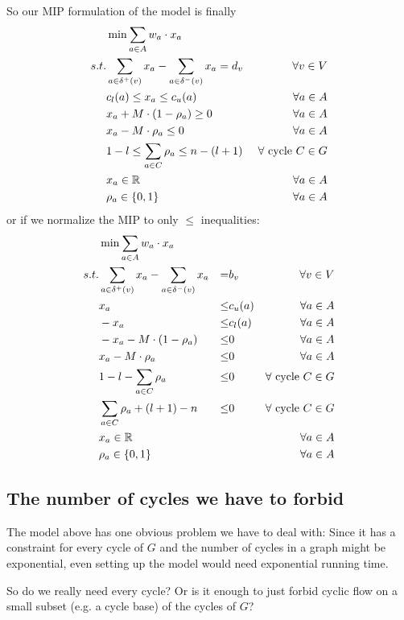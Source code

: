 So our MIP formulation of the model is finally
\begin{align*}
 &\min \sum_{a\in A} w_a\cdot x_a & \\
 s.t. & \sum_{a\in \delta^+(v)}x_a - \sum_{a\in\delta^- (v)}x_a = d_v\ &\forall v\in V \\
  & c_l(a)\le x_a \le c_u(a) & \forall a\in A\\
 &x_a + M\cdot (1-\rho_a) \ge 0 & \forall a\in A\\
 &x_a - M\cdot \rho_a \le 0 & \forall a\in A\\
 &1-l \le \sum_{a\in C}\rho_a \le n-(l+1) & \forall \textrm{ cycle }C\in G\\
 & x_a \in \mathbb{R} &\forall a\in A\\
 & \rho_a \in \{0,1\} &\forall a\in A
\end{align*}
or if we normalize the MIP to only $\le$ inequalities:
\begin{align}
 &\min \sum_{a\in A} w_a\cdot x_a & \\
 s.t. & \sum_{a\in \delta^+(v)}x_a - \sum_{a\in\delta^- (v)}x_a &=& b_v\ &\forall v\in V \\
 & x_a &\le& c_u(a) & \forall a\in A\\
 & -x_a &\le& c_l(a) & \forall a\in A\\
 &-x_a - M\cdot (1-\rho_a) &\le& 0 & \forall a\in A\\
 &x_a - M\cdot \rho_a &\le& 0 & \forall a\in A\\
 &1-l - \sum_{a\in C}\rho_a &\le& 0 & \forall \textrm{ cycle }C\in G\\
 & \sum_{a\in C}\rho_a +(l+1)-n &\le& 0 & \forall \textrm{ cycle }C\in G\\
 & x_a \in \mathbb{R} & & &\forall a\in A\\
 & \rho_a \in \{0,1\} & & &\forall a\in A
\end{align}


\subsection{The number of cycles we have to forbid}
The model above has one obvious problem we have to deal with: Since it has a constraint for every cycle of $G$ and the 
number of cycles in a graph might be exponential, even setting up the model would need exponential running time. 

So do we really need every cycle? Or is it enough to just forbid cyclic flow on a small subset (e.g. a cycle base) of 
the cycles of $G$? 

